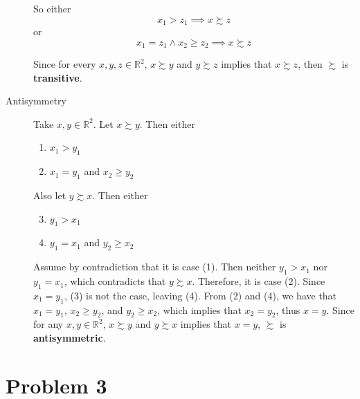 \documentclass[12pt]{extarticle}
\numberwithin{table}{section}
\numberwithin{figure}{section}
\numberwithin{equation}{section}
\begin{document}
\begin{description}
          So either
          \begin{equation}
              x_1 > z_1 \implies x \succsim z
          \end{equation}
          or
          \begin{equation}
              x_1 = z_1 \land x_2 \ge z_2 \implies x \succsim z
          \end{equation}

          Since for every $x, y, z \in \mathbb{R}^2$, $x \succsim y$ and $y \succsim z$ implies that $x \succsim z$, then $\succsim$ is \textbf{transitive}.
    \item[Antisymmetry]
          Take $x, y \in \mathbb{R}^2$. Let $x \succsim y$.
          Then either
          \begin{enumerate}
              \item $x_1 > y_1$
              \item $x_1 = y_1$ and $x_2 \ge y_2$
          \end{enumerate}
          Also let $y \succsim x$. Then either
          \begin{enumerate}
              \setcounter{enumi}{2}
              \item $y_1 > x_1$
              \item $y_1 = x_1$ and $y_2 \ge x_2$
          \end{enumerate}
          Assume by contradiction that it is case (1).
          Then neither $y_1 > x_1$ nor $y_1 = x_1$, which contradicts that $y \succsim x$. Therefore, it is case (2).
          Since $x_1 = y_1$, (3) is not the case, leaving (4).
          From (2) and (4), we have that $x_1 = y_1$, $x_2 \ge y_2$, and $y_2 \ge x_2$, which implies that $x_2 = y_2$, thus $x = y$. Since for any $x, y \in \mathbb{R}^2$, $x \succsim y$ and $y \succsim x$ implies that $x = y$, $\succsim$ is \textbf{antisymmetric}.
\end{description}

\section*{Problem 3}
\end{document}
